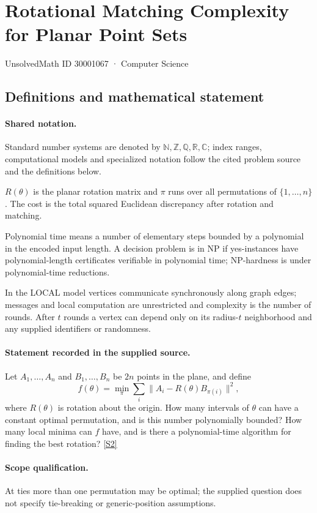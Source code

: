\documentclass[11pt]{article}
\newcommand{\sref}[2]{\hyperlink{source:#1:#2}{[S#2]}}
\begin{document}
\setcounter{section}{30001066}
\section{Rotational Matching Complexity for Planar Point Sets}\label{30001067}
{\small\sffamily UnsolvedMath ID 30001067 · Computer Science}
\subsection{Definitions and mathematical statement}

\paragraph{Shared notation.}Standard number systems are denoted by $\mathbb N,\mathbb Z,\mathbb Q,\mathbb R,\mathbb C$; index ranges, computational models and specialized notation follow the cited problem source and the definitions below.


$R(\theta)$ is the planar rotation matrix and $\pi$ runs over all permutations of $\{1,\ldots,n\}$. The cost is the total squared Euclidean discrepancy after rotation and matching.

Polynomial time means a number of elementary steps bounded by a polynomial in the encoded input length. A decision problem is in $\mathrm{NP}$ if yes-instances have polynomial-length certificates verifiable in polynomial time; NP-hardness is under polynomial-time reductions.

In the LOCAL model vertices communicate synchronously along graph edges; messages and local computation are unrestricted and complexity is the number of rounds. After $t$ rounds a vertex can depend only on its radius-$t$ neighborhood and any supplied identifiers or randomness.
\paragraph{Statement recorded in the supplied source.}
Let $A_1,\ldots,A_n$ and $B_1,\ldots,B_n$ be $2n$ points in the plane, and define $$f(\theta)=\min_{\pi}\sum_i\|A_i-R(\theta)B_{\pi(i)}\|^2,$$ where $R(\theta)$ is rotation about the origin. How many intervals of $\theta$ can have a constant optimal permutation, and is this number polynomially bounded? How many local minima can $f$ have, and is there a polynomial-time algorithm for finding the best rotation? \sref{30001067}{2}
\paragraph{Scope qualification.}
At ties more than one permutation may be optimal; the supplied question does not specify tie-breaking or generic-position assumptions.
\end{document}
